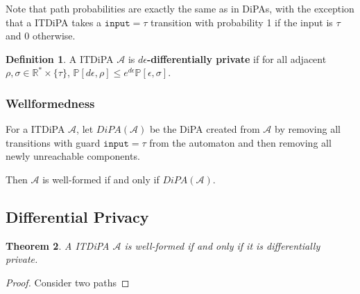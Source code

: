\documentclass[12pt]{article}
\newcommand{\RR}{\mathbb{R}}
\newcommand{\PP}{\mathbb{P}}
\newtheorem{thm}{Theorem}[section]
\theoremstyle{definition}
\newtheorem{defn}[thm]{Definition}
\begin{document}
Note that path probabilities are exactly the same as in DiPAs, with the exception that a ITDiPA takes a $\texttt{input} = \tau$ transition with probability 1 if the input is $\tau$ and 0 otherwise.

\begin{defn}
	A ITDiPA $\mathcal{A}$ is \textbf{$d\epsilon$-differentially private} if for all adjacent $\rho, \sigma \in \RR^*\times \{\tau\}$, $\PP[d\epsilon, \rho] \leq e^{d\epsilon} \PP[\epsilon, \sigma]$.
\end{defn}

\subsubsection{Wellformedness}

For a ITDiPA $\mathcal{A}$, let $DiPA(\mathcal{A})$ be the DiPA created from $\mathcal{A}$ by removing all transitions with guard $\texttt{input} = \tau$ from the automaton and then removing all newly unreachable components. 

Then $\mathcal{A}$ is well-formed if and only if $DiPA(\mathcal{A})$.

\subsection{Differential Privacy}

\begin{thm}
	A ITDiPA $\mathcal{A}$ is well-formed if and only if it is differentially private.
\end{thm}

\begin{proof}
	Consider two paths 
\end{proof}


\end{document}
